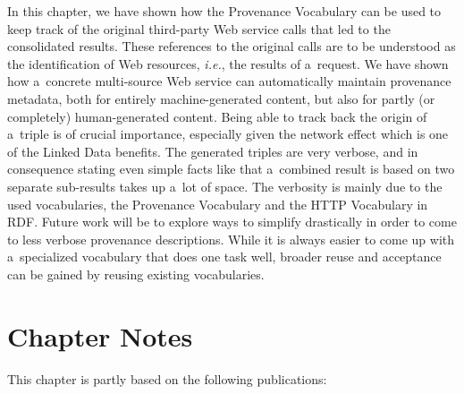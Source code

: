 In this chapter, we have shown how the Provenance
Vocabulary can be used to keep track of the original
third-party Web service calls that led to the consolidated
results. These references to the original calls
are to be understood as the identification of Web resources,
\emph{i.e.}, the results of a~request.
We have shown how a~concrete multi-source Web service can
automatically maintain provenance metadata,
both for entirely machine-generated content,
but also for partly (or completely) human-generated content.
Being able to track back the origin of a~triple
is of crucial importance,
especially given the network effect which is one of the
Linked Data benefits.
The generated triples are very verbose,
and in consequence stating even simple facts like
that a~combined result is based on two separate sub-results
takes up a~lot of space.
The verbosity is mainly due to the used vocabularies,
the Provenance Vocabulary and the HTTP Vocabulary in RDF.
Future work will be to explore ways
to simplify drastically in order to come to
less verbose provenance descriptions.
While it is always easier to come up with a~specialized vocabulary
that does one task well, broader reuse and acceptance
can be gained by reusing existing vocabularies.

\section*{Chapter Notes}
This chapter is partly based on the following publications:
